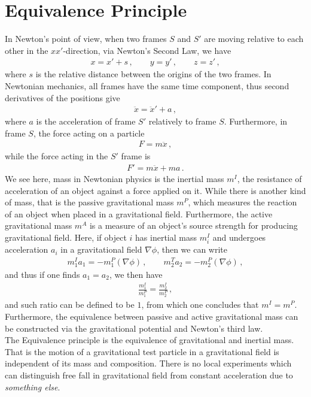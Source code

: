 \documentclass[11pt, onesided]{book}
\theoremstyle{break}
\theoremstyle{break}
\begin{document}
\section[Equivalence Principle]{\color{red}Equivalence Principle\color{black}}
In Newton's point of view, when two frames $S$ and $S'$ are moving relative to each other in the $xx'$-direction, via Newton's Second Law, we have
\begin{align*}
x = x' + s \,,\qquad y = y'\,,\qquad z=z'\,,
\end{align*}
where $s$ is the relative distance between the origins of the two frames. In Newtonian mechanics, all frames have the same time component, thus second derivatives of the positions give
\begin{align*}
\ddot{x} = \ddot{x}' + a\,,
\end{align*}
where $a$ is the acceleration of frame $S'$ relatively to frame $S$. Furthermore, in frame $S$, the force acting on a particle
\begin{align*}
F = m\ddot{x}\,,
\end{align*}
while the force acting in the $S'$ frame is
\begin{align*}
F' = m\ddot{x} + ma\,.
\end{align*}
We see here, mass in Newtonian physics is the inertial mass $m^I$, the resistance of acceleration of an object against a force applied on it. While there is another kind of mass, that is the passive gravitational mass $m^P$, which measures the reaction of an object when placed in a gravitational field. Furthermore, the active gravitational mass $m^A$ is a measure of an object's source strength for producing gravitational field. Here, if object $i$ has inertial mass $m_i^I$ and undergoes acceleration $a_i$ in a gravitational field $\nabla \phi$, then we can write
\begin{align*}
m_1^I a_1 = -m_1^P (\nabla\phi)\,,\qquad m_2^T a_2 = -m_2^P(\nabla \phi)\,,
\end{align*}
and thus if one finds $a_1 = a_2$, we then have
\begin{align*}
\frac{m_1^I}{m_1^P} = \frac{m_2^I}{m_2^P}\,,
\end{align*}
and such ratio can be defined to be $1$, from which one concludes that $m^I = m^P$. Furthermore, the equivalence between passive and active gravitational mass can be constructed via the gravitational potential and Newton's third law. \\


The Equivalence principle is the equivalence of gravitational and inertial mass. That is the motion of a gravitational test particle in a gravitational field is independent of its mass and composition. There is no local experiments which can distinguish free fall in gravitational field from constant acceleration due to \textit{something else}. \\
\end{document}
